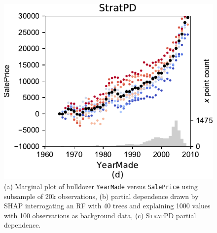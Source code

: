 \documentclass{article}
\newcommand{\spd}{\fontfamily{cmr}\textsc{\small StratPD}}
\begin{document}
\begin{figure}[htbp]
\begin{center}
\includegraphics[scale=0.35]{images/bulldozer_YearMade_stratpd.pdf}
\caption{\small (a) Marginal plot of bulldozer {\tt YearMade} versus {\tt SalePrice} using subsample of 20k observations, (b) partial dependence drawn by SHAP interrogating an RF with 40 trees and explaining 1000 values with 100 observations as background data, (c) \spd{} partial dependence.}
\label{fig:yearmade}
\end{center}
\end{figure}
\end{document}
